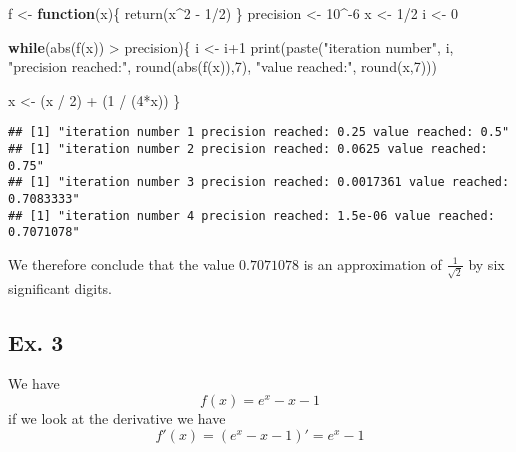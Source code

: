 \documentclass[
]{article}
\newenvironment{Shaded}{\begin{snugshade}}{\end{snugshade}}
\newcommand{\ControlFlowTok}[1]{\textcolor[rgb]{0.13,0.29,0.53}{\textbf{#1}}}
\newcommand{\DecValTok}[1]{\textcolor[rgb]{0.00,0.00,0.81}{#1}}
\newcommand{\FunctionTok}[1]{\textcolor[rgb]{0.00,0.00,0.00}{#1}}
\newcommand{\NormalTok}[1]{#1}
\newcommand{\OtherTok}[1]{\textcolor[rgb]{0.56,0.35,0.01}{#1}}
\newcommand{\SpecialCharTok}[1]{\textcolor[rgb]{0.00,0.00,0.00}{#1}}
\newcommand{\StringTok}[1]{\textcolor[rgb]{0.31,0.60,0.02}{#1}}
\begin{document}
\begin{Shaded}
\begin{Highlighting}[]
\NormalTok{f }\OtherTok{\textless{}{-}} \ControlFlowTok{function}\NormalTok{(x)\{}
  \FunctionTok{return}\NormalTok{(x}\SpecialCharTok{\^{}}\DecValTok{2} \SpecialCharTok{{-}} \DecValTok{1}\SpecialCharTok{/}\DecValTok{2}\NormalTok{)}
\NormalTok{\}}
\NormalTok{precision }\OtherTok{\textless{}{-}} \DecValTok{10}\SpecialCharTok{\^{}{-}}\DecValTok{6}
\NormalTok{x }\OtherTok{\textless{}{-}} \DecValTok{1}\SpecialCharTok{/}\DecValTok{2}
\NormalTok{i }\OtherTok{\textless{}{-}} \DecValTok{0}

\ControlFlowTok{while}\NormalTok{(}\FunctionTok{abs}\NormalTok{(}\FunctionTok{f}\NormalTok{(x)) }\SpecialCharTok{\textgreater{}}\NormalTok{ precision)\{}
\NormalTok{  i }\OtherTok{\textless{}{-}}\NormalTok{ i}\SpecialCharTok{+}\DecValTok{1}
  \FunctionTok{print}\NormalTok{(}\FunctionTok{paste}\NormalTok{(}\StringTok{"iteration number"}\NormalTok{, i, }\StringTok{"precision reached:"}\NormalTok{, }\FunctionTok{round}\NormalTok{(}\FunctionTok{abs}\NormalTok{(}\FunctionTok{f}\NormalTok{(x)),}\DecValTok{7}\NormalTok{), }\StringTok{"value reached:"}\NormalTok{, }\FunctionTok{round}\NormalTok{(x,}\DecValTok{7}\NormalTok{)))}


\NormalTok{  x }\OtherTok{\textless{}{-}}\NormalTok{ (x }\SpecialCharTok{/} \DecValTok{2}\NormalTok{) }\SpecialCharTok{+}\NormalTok{ (}\DecValTok{1} \SpecialCharTok{/}\NormalTok{ (}\DecValTok{4}\SpecialCharTok{*}\NormalTok{x))}
\NormalTok{\}}
\end{Highlighting}
\end{Shaded}

\begin{verbatim}
## [1] "iteration number 1 precision reached: 0.25 value reached: 0.5"
## [1] "iteration number 2 precision reached: 0.0625 value reached: 0.75"
## [1] "iteration number 3 precision reached: 0.0017361 value reached: 0.7083333"
## [1] "iteration number 4 precision reached: 1.5e-06 value reached: 0.7071078"
\end{verbatim}

We therefore conclude that the value \(0.7071078\) is an approximation
of \(\frac{1}{\sqrt2}\) by six significant digits.

\hypertarget{ex.-3}{%
\subsection{Ex. 3}\label{ex.-3}}

We have \[
    f(x) = e^x - x - 1
\] if we look at the derivative we have \[
f'(x) = (e^x - x - 1)' = e^x - 1
\]
\end{document}
